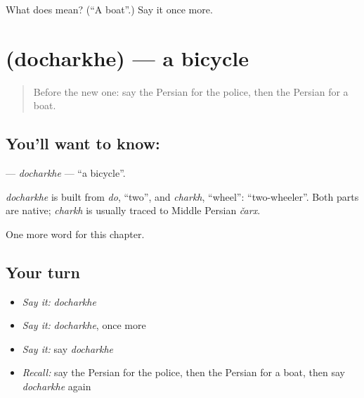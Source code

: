 \begin{tcolorbox}[breakable,colback=teal!4,colframe=teal!35!black,title={Before you move on}]
What does  mean? (\textquotedblleft{}A boat\textquotedblright{}.) Say it once more.
\end{tcolorbox}
\section[\texorpdfstring{\fa{دوچرخه} (docharkhe)}{دوچرخه (docharkhe)}]{ (docharkhe) — a bicycle}

\label{lesson:FA-C72-docharkhe}



\begin{quote}
Before the new one: say the Persian for the police, then the Persian for a boat.
\end{quote}

\subsection*{You'll want to know: }
\textbf{} — \emph{docharkhe} — \textquotedblleft{}a bicycle\textquotedblright{}.

\begin{cousinweb}
\emph{docharkhe} is built from \emph{do}, \textquotedblleft{}two\textquotedblright{}, and \emph{charkh}, \textquotedblleft{}wheel\textquotedblright{}: \textquotedblleft{}two-wheeler\textquotedblright{}. Both parts are native; \emph{charkh} is usually traced to Middle Persian \emph{čarx}.
\end{cousinweb}

\begin{grammarlens}[title={What you've built}]
One more word for this chapter.
\end{grammarlens}

\subsection*{Your turn}
\begin{itemize}
\raggedright
  \item \emph{Say it:} \emph{docharkhe}
  \item \emph{Say it:} \emph{docharkhe}, once more
  \item \emph{Say it:} say \emph{docharkhe}
  \item \emph{Recall:} say the Persian for the police, then the Persian for a boat, then say \emph{docharkhe} again
\end{itemize}

